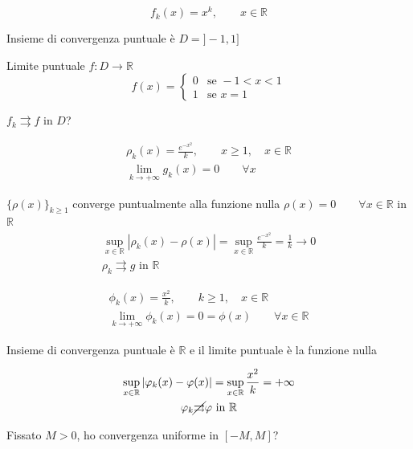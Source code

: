 \begin{exbar}
\begin{example}
	\begin{equation*}
		f_k(x) = x^k, \qquad x \in \mathbb{R}
	\end{equation*}

	Insieme di convergenza puntuale è $D=]-1,1]$
	
	Limite puntuale $f:D \rightarrow \mathbb{R}$
	\begin{equation*}
		f (x) = 
		\begin{cases}
			0 & \text{se } -1 < x < 1
			\\
			1 & \text{se } x = 1
		\end{cases}
	\end{equation*}
	
	$f_k \rightrightarrows f$ in $D$?

	\begin{gather*}
		\rho_k(x)= \frac{e^{-x^2}}{k}, \qquad x \geq 1, \quad x \in \mathbb{R}
		\\
		\lim_{k \rightarrow +\infty} g_k(x)=0 \qquad \forall x
	\end{gather*}

		$\{ \rho(x) \}_{k \geq 1}$ converge puntualmente alla funzione nulla $\rho(x) = 0 \qquad  \forall x \in \mathbb{R}$ in $\mathbb{R}$
		\begin{gather*}
			\sup_{x \in \mathbb{R}} |\rho_k(x) - \rho(x)| = \sup_{x \in \mathbb{R}} \frac{e^{-x^2}}{k} = \frac{1}{k} \rightarrow 0
			\\
			\rho_k \rightrightarrows g \text{ in } \mathbb{R}
		\end{gather*}

	\begin{gather*}
		\phi_k(x) = \frac{x^2}{k}, \qquad k \geq 1, \quad x \in \mathbb{R}
		\\
		\lim_{k \rightarrow +\infty} \phi_k(x) = 0 = \phi(x) \qquad \forall x \in \mathbb{R}
	\end{gather*}
	
	Insieme di convergenza puntuale è $\mathbb{R}$ e il limite puntuale è la funzione nulla
	
	\begin{gather*}
		\sup_{x \in \mathbb{R}} |\varphi_k(x) - \varphi(x)| = \sup_{x \in \mathbb{R}} \frac{x^2}{k} = +\infty
		\\
		\varphi_k \cancel{\rightrightarrows} \varphi \text{ in } \mathbb{R}
	\end{gather*}
		
	Fissato $M > 0$, ho convergenza uniforme in $[-M, M]$?
	

\end{example}
\end{exbar}
